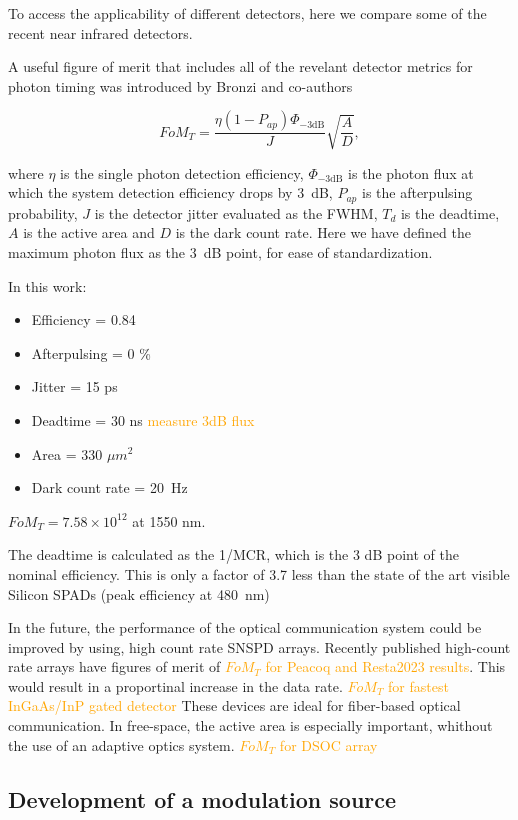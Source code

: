 \documentclass[11pt]{caltech_thesis} %
\begin{document}
To access the applicability of different detectors, here we compare some
of the recent near infrared detectors.

A useful figure of merit that includes all of the revelant detector
metrics for photon timing was introduced by Bronzi and co-authors
\autocite{Bronzi2016}

$$FoM_T = \frac{\eta  (1 - P_{ap})\Phi_{-3 \text{dB}}}{J} \sqrt{\frac{A}{D}},$$

where $\eta$ is the single photon detection efficiency,
$\Phi_{-3 \text{dB}}$ is the photon flux at which the system detection
efficiency drops by 3~dB, $P_{ap}$ is the afterpulsing
probability, $J$ is the detector jitter evaluated as the FWHM, $T_d$ is
the deadtime, $A$ is the active area and $D$ is the dark count rate.
Here we have defined the maximum photon flux as the 3~dB
point, for ease of standardization.

In this work:

\begin{itemize}
\tightlist
\item
  Efficiency = 0.84
\item
  Afterpulsing = 0 \%
\item
  Jitter = 15 ps
\item
  Deadtime = 30 ns \textcolor{orange}{measure 3dB flux}
\item
  Area = 330 $\mu m^2$
\item
  Dark count rate = 20~Hz
\end{itemize}

$FoM_T = 7.58 \times 10^{12}$ at 1550 nm.

The deadtime is calculated as the 1/MCR, which is the 3 dB point of the
nominal efficiency. This is only a factor of 3.7 less than the state of
the art visible Silicon SPADs (peak efficiency at 480~nm)
\autocite{Gramuglia2022}

In the future, the performance of the optical communication system could
be improved by using, high count rate SNSPD arrays. Recently published
high-count rate arrays have figures of merit of
\textcolor{orange}{$FoM_T$ for Peacoq and Resta2023 results}. This would
result in a proportinal increase in the data rate.
\textcolor{orange}{$FoM_T$ for fastest InGaAs/InP gated detector} These
devices are ideal for fiber-based optical communication. In free-space,
the active area is especially important, whithout the use of an adaptive
optics system. \textcolor{orange}{$FoM_T$ for DSOC array}

\hypertarget{development-of-a-modulation-source}{%
\subsection{Development of a modulation
source}\label{development-of-a-modulation-source}}
\end{document}
